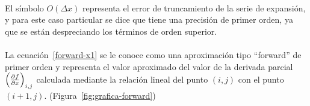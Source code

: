 \documentclass[letterpaper, openright, 12pt]{book}
\begin{document}
    \paragraph*{}
    El símbolo $O(\Delta x)$ representa el error de truncamiento de la serie de
    expansión, y para este caso particular se dice que tiene una precisión de
    primer orden, ya que se están despreciando los términos de orden superior.

    \paragraph*{}
    La ecuación~\ref{forward-x1} se le conoce como una aproximación tipo
    ``forward'' de primer orden y representa el valor aproximado del valor de la
    derivada parcial $\left( \pdv{f}{x}\right)_{i,j}$ calculada mediante la
    relación lineal del punto $(i,j)$ con el punto $(i+1,j)$.
    (Figura~\ref{fig:grafica-forward})
\end{document}

